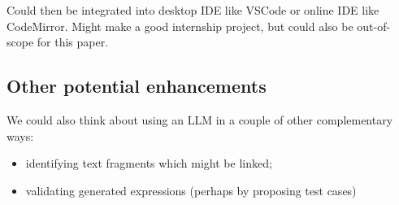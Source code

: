 Could then be integrated into desktop IDE like VSCode or online IDE like CodeMirror. Might make a good
internship project, but could also be out-of-scope for this paper.

\subsection{Other potential enhancements}\label{subsec:other-potential-enhancements}

We could also think about using an LLM in a couple of other complementary ways:
\begin{itemize}
\item identifying text fragments which might be linked;
\item validating generated expressions (perhaps by proposing test cases)
\end{itemize}


